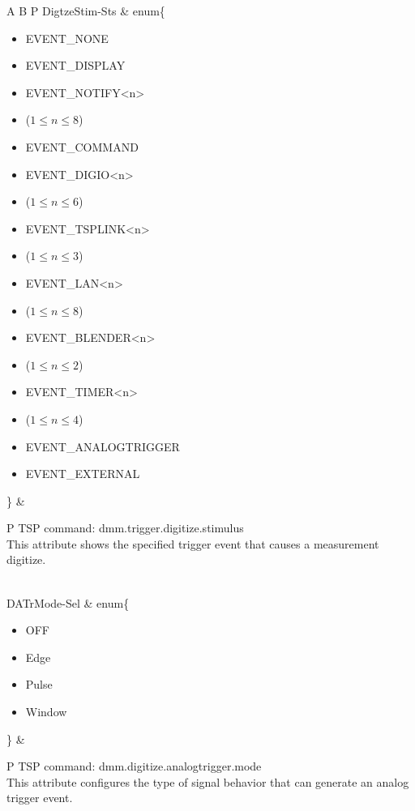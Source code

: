 \documentclass[openany]{article}
\begin{document}
\begin{longtable}{A B P}
		DigtzeStim-Sts & enum\{\begin{itemize}[noitemsep]
					\small
					\item[] EVENT\_NONE
					\item[] EVENT\_DISPLAY
					\item[] EVENT\_NOTIFY\textless n\textgreater
					\item[] ($1\leq n\leq 8$)
					\item[] EVENT\_COMMAND
					\item[] EVENT\_DIGIO\textless n\textgreater
					\item[] ($1\leq n\leq 6$)
					\item[] EVENT\_TSPLINK\textless n\textgreater
					\item[] ($1\leq n\leq 3$)
					\item[] EVENT\_LAN\textless n\textgreater
					\item[] ($1\leq n\leq 8$)
					\item[] EVENT\_BLENDER\textless n\textgreater 
					\item[] ($1\leq n\leq 2$)
					\item[] EVENT\_TIMER\textless n\textgreater
					\item[] ($1\leq n\leq 4$)
					\item[] EVENT\_ANALOGTRIGGER
					\item[] EVENT\_EXTERNAL
				\end{itemize}\} & 
				\begin{tabular}{P}
					TSP command: dmm.trigger.digitize.stimulus \\
					This attribute shows the specified trigger event that causes a measurement digitize.
				\end{tabular} \\ \hline
		DATrMode-Sel & enum\{\begin{itemize}[noitemsep]
					\small
					\item[] OFF
					\item[] Edge
					\item[] Pulse
					\item[] Window
				\end{itemize}\} & 
				\begin{tabular}{P}
					TSP command: dmm.digitize.analogtrigger.mode \\
					This attribute configures the type of signal behavior that can generate an analog trigger event.
				\end{tabular} \\


\end{longtable}
\end{document}
